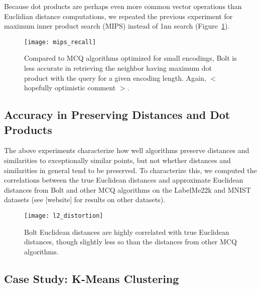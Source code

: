 Because dot products are perhaps even more common vector operations than Euclidian distance computations, we repeated the previous experiment for maximum inner product search (MIPS) instead of 1nn search (Figure~\ref{fig:mips_acc}).

\begin{figure}[h]
\begin{center}
\label{fig:mips_acc}
\texttt{[image: mips\_recall]}
\caption{Compared to MCQ algorithms optimized for small encodings, Bolt is less accurate in retrieving the neighbor having maximum dot product with the query for a given encoding length. Again, $<$ hopefully optimistic comment $>$.}
\end{center}
\end{figure}


\subsection{Accuracy in Preserving Distances and Dot Products}

The above experiments characterize how well algorithms preserve distances and similarities to exceptionally similar points, but not whether distances and similarities in general tend to be preserved. To characterize this, we computed the correlations between the true Euclidean distances and approximate Euclidean distances from Bolt and other MCQ algorithms on the LabelMe22k and MNIST datasets (see [website] for results on other datasets).

\begin{figure}[h]
\begin{center}
\label{fig:corr_acc}
\texttt{[image: l2\_distortion]}
\caption{Bolt Euclidean distances are highly correlated with true Euclidean distances, though slightly less so than the distances from other MCQ algorithms.}
\end{center}
\end{figure}



\subsection{Case Study: K-Means Clustering}

